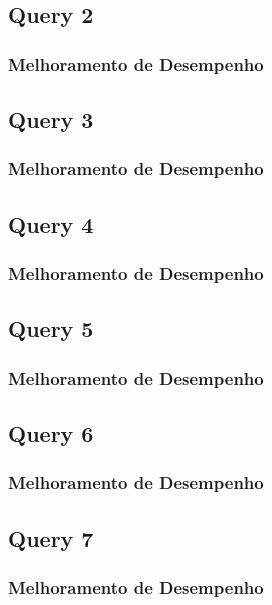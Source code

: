 \documentclass[a4paper]{article}
\begin{document}
\subsection{Query 2}

\subsubsection{Melhoramento de Desempenho}

\subsection{Query 3}

\subsubsection{Melhoramento de Desempenho}

\subsection{Query 4}

\subsubsection{Melhoramento de Desempenho}

\subsection{Query 5}

\subsubsection{Melhoramento de Desempenho}

\subsection{Query 6}

\subsubsection{Melhoramento de Desempenho}

\subsection{Query 7}

\subsubsection{Melhoramento de Desempenho}
\end{document}
